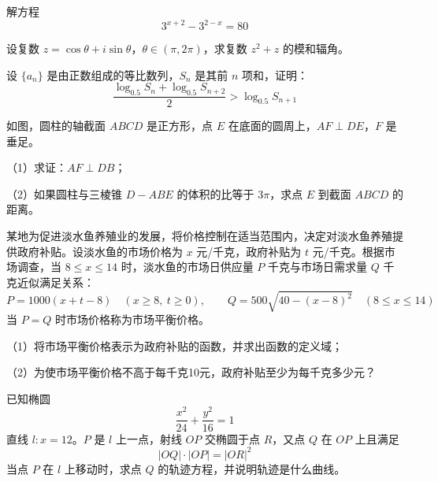 \begin{question}
解方程
\nopagebreak[4]
\[
3^{x+2}-3^{2-x}=80
\]

\end{question}
\begin{question}
设复数 $z=\cos\theta+i\sin\theta$，$\theta\in(\pi,2\pi)$，求复数 $z^2+z$ 的模和辐角。

\end{question}
\begin{question}
设 $\{a_n\}$ 是由正数组成的等比数列，$S_n$ 是其前 $n$ 项和，证明：
\nopagebreak[4]
\[
\frac{\log_{0.5}S_n+\log_{0.5}S_{n+2}}{2}>\log_{0.5}S_{n+1}
\]

\Needspace{0.4\textheight}
\end{question}
\begin{question}
如图，圆柱的轴截面 $ABCD$ 是正方形，点 $E$ 在底面的圆周上，$AF\perp DE$，$F$ 是垂足。
\nopagebreak[4]
\begin{center}\end{center}
\nopagebreak[4]
（1）求证：$AF\perp DB$；

（2）如果圆柱与三棱锥 $D-ABE$ 的体积的比等于 $3\pi$，求点 $E$ 到截面 $ABCD$ 的距离。

\end{question}
\begin{question}
某地为促进淡水鱼养殖业的发展，将价格控制在适当范围内，决定对淡水鱼养殖提供政府补贴。设淡水鱼的市场价格为 $x$ 元/千克，政府补贴为 $t$ 元/千克。根据市场调查，当 $8\le x\le14$ 时，淡水鱼的市场日供应量 $P$ 千克与市场日需求量 $Q$ 千克近似满足关系：
\nopagebreak[4]
\[
P=1000(x+t-8)\quad(x\ge8,\ t\ge0),\qquad
Q=500\sqrt{40-(x-8)^2}\quad(8\le x\le14)
\]
当 $P=Q$ 时市场价格称为市场平衡价格。

（1）将市场平衡价格表示为政府补贴的函数，并求出函数的定义域；

（2）为使市场平衡价格不高于每千克10元，政府补贴至少为每千克多少元？

\end{question}
\begin{question}
已知椭圆
\nopagebreak[4]
\[
\frac{x^2}{24}+\frac{y^2}{16}=1
\]
直线 $l:x=12$。$P$ 是 $l$ 上一点，射线 $OP$ 交椭圆于点 $R$，又点 $Q$ 在 $OP$ 上且满足
\nopagebreak[4]
\[
|OQ|\cdot|OP|=|OR|^2
\]
当点 $P$ 在 $l$ 上移动时，求点 $Q$ 的轨迹方程，并说明轨迹是什么曲线。

\end{question}